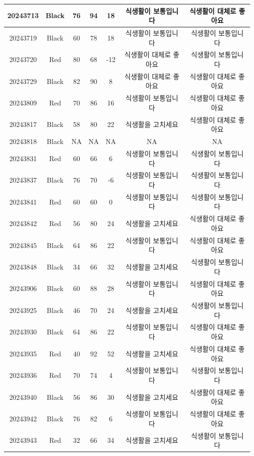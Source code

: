 \documentclass[
]{book}
\begin{document}
\begin{tabular}{c|c|c|c|c|c|c}
\hline
20243713 & Black & 76 & 94 & 18 & 식생활이 보통입니다 & 식생활이 대체로 좋아요\\
\hline
20243719 & Black & 60 & 78 & 18 & 식생활이 보통입니다 & 식생활이 보통입니다\\
\hline
20243720 & Red & 80 & 68 & -12 & 식생활이 대체로 좋아요 & 식생활이 보통입니다\\
\hline
20243729 & Black & 82 & 90 & 8 & 식생활이 대체로 좋아요 & 식생활이 대체로 좋아요\\
\hline
20243809 & Red & 70 & 86 & 16 & 식생활이 보통입니다 & 식생활이 대체로 좋아요\\
\hline
20243817 & Black & 58 & 80 & 22 & 식생활을 고치세요 & 식생활이 대체로 좋아요\\
\hline
20243818 & Black & NA & NA & NA & NA & NA\\
\hline
20243831 & Red & 60 & 66 & 6 & 식생활이 보통입니다 & 식생활이 보통입니다\\
\hline
20243837 & Black & 76 & 70 & -6 & 식생활이 보통입니다 & 식생활이 보통입니다\\
\hline
20243841 & Red & 60 & 60 & 0 & 식생활이 보통입니다 & 식생활이 보통입니다\\
\hline
20243842 & Red & 56 & 80 & 24 & 식생활을 고치세요 & 식생활이 대체로 좋아요\\
\hline
20243845 & Black & 64 & 86 & 22 & 식생활이 보통입니다 & 식생활이 대체로 좋아요\\
\hline
20243848 & Black & 34 & 66 & 32 & 식생활을 고치세요 & 식생활이 보통입니다\\
\hline
20243906 & Black & 60 & 88 & 28 & 식생활이 보통입니다 & 식생활이 대체로 좋아요\\
\hline
20243925 & Black & 46 & 70 & 24 & 식생활을 고치세요 & 식생활이 보통입니다\\
\hline
20243930 & Black & 64 & 86 & 22 & 식생활이 보통입니다 & 식생활이 대체로 좋아요\\
\hline
20243935 & Red & 40 & 92 & 52 & 식생활을 고치세요 & 식생활이 대체로 좋아요\\
\hline
20243936 & Red & 70 & 74 & 4 & 식생활이 보통입니다 & 식생활이 보통입니다\\
\hline
20243940 & Black & 56 & 86 & 30 & 식생활을 고치세요 & 식생활이 대체로 좋아요\\
\hline
20243942 & Black & 76 & 82 & 6 & 식생활이 보통입니다 & 식생활이 대체로 좋아요\\
\hline
20243943 & Red & 32 & 66 & 34 & 식생활을 고치세요 & 식생활이 보통입니다\\
\hline

\end{tabular}
\end{document}
